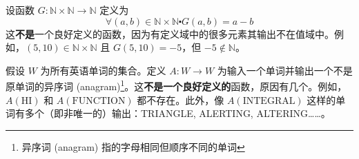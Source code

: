 \begin{example}
    设函数 $G : \mathbb{N} \times \mathbb{N} \to \mathbb{N}$ 定义为
    \[\forall (a, b) \in \mathbb{N} \times \mathbb{N} \centerdot G(a, b) = a - b\]
    这\textbf{不是}一个良好定义的函数，因为有定义域中的很多元素其输出不在值域中。例如，$(5, 10) \in \mathbb{N} \times \mathbb{N}$ 且 $G(5, 10) = -5$，但 $-5 \notin \mathbb{N}$。
\end{example}

\begin{example}
    假设 $W$ 为所有英语单词的集合。定义 $A: W \to W$ 为输入一个单词并输出一个不是原单词的异序词 (anagram)\footnote{异序词 (anagram) 指的字母相同但顺序不同的单词}。这\textbf{不是一个良好定义的}函数，原因有几个。例如，$A(\text{HI})$ 和 $A(\text{FUNCTION})$ 都不存在。此外，像 $A(\text{INTEGRAL})$ 这样的单词有多个（即非唯一的）输出：TRIANGLE, ALERTING, ALTERING……。
\end{example}